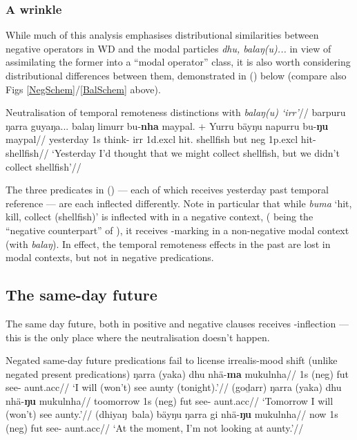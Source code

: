 \subsubsection*{A wrinkle}

While much of this analysis emphasises distributional similarities between negative operators in WD and the modal particles \textit{dhu, balaŋ(u)...} in view of assimilating the former into a ``modal operator'' class, it is also worth considering distributional differences between them, demonstrated in (\nextx) below (compare also Figs \ref{NegSchem}/\ref{BalSchem} above).

\pex\begingl\glpreamble Neutralisation of temporal remoteness distinctions with \textit{balaŋ(u) `\gls{irr}'}//
\gla barpuru ŋarra guyaŋa... balaŋ limurr bu-\textbf{nha} maypal. + Yurru bäyŋu napurru bu-\textbf{ŋu} maypal//
\glb yesterday 1s think-\I{} \gls{irr} 1d.\gls{excl} hit.\IV{} shellfish but \gls{neg} 1p.\gls{excl} hit-\II{} shellfish//
\glft`Yesterday I'd thought that we might collect shellfish, but we didn't collect shellfish'\trailingcitation{[AW~20190429]}//\endgl
\xe{}


The three predicates in (\lastx) --- each of which receives yesterday past temporal reference --- are each inflected differently. Note in particular that while \textit{buma} `hit, kill, collect (shellfish)' is inflected with \II{}  in a negative context, (\II{} being the ``negative counterpart'' of \I{}), it receives \IV{}-marking in a non-negative modal context (with \textit{balaŋ}). In effect, the temporal remoteness effects in the past are lost in modal contexts, but not in negative predications.



\subsection{The same-day future}\label{yolngu-sdf}


The same day future, both in positive and negative clauses receives \I-inflection --- this is the only place where the neutralisation doesn't happen.

\pex Negated same-day future predications fail to license irrealis-mood shift (unlike negated present predications)\trailingcitation{[AW~20190501]}
\a\begingl\gla ŋarra (yaka) dhu nhä-\textbf{ma} mukulnha//
\glb 1s (\gls{neg}) \gls{fut} see-\I{} aunt.\gls{acc}//
\glft `I will (won't) see aunty (tonight).'//\endgl
\a \begingl\gla (goḏarr) ŋarra (yaka) dhu nhä-\textbf{ŋu} mukulnha//
\glb toomorrow 1s (\gls{neg}) \gls{fut} see-\II{} aunt.\gls{acc}//
\glft `Tomorrow I will (won't) see aunty.'//\endgl
\a\begingl\gla (dhiyaŋ~bala) bäyŋu ŋarra gi nhä-\textbf{ŋu} mukulnha//
\glb now 1s (\gls{neg}) \gls{fut} see-\II{} aunt.\gls{acc}//
\glft `At the moment, I'm not looking at aunty.'//\endgl
\xe


